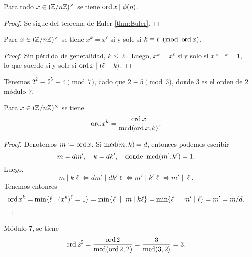 \documentclass{article}
\theoremstyle{plain}
\begin{document}
\begin{corolario}
  Para todo $x \in (\mathbb{Z}/n\mathbb{Z})^\times$ se tiene $\operatorname{ord} x \mid \phi (n)$.

  \begin{proof}
    Se sigue del teorema de Euler \ref{thm:Euler}.
  \end{proof}
\end{corolario}

\begin{corolario}
  Para $x \in (\mathbb{Z}/n\mathbb{Z})^\times$ se tiene $x^k = x^\ell$ si y solo si
  $k \equiv \ell \pmod{\operatorname{ord} x}$.

  \begin{proof}
    Sin pérdida de generalidad, $k \le \ell$. Luego, $x^k = x^\ell$ si y solo si
    $x^{\ell - k} = 1$, lo que sucede si y solo si $\operatorname{ord} x \mid (\ell - k)$.
  \end{proof}
\end{corolario}

\begin{ejemplo}
  Tenemos $2^2 \equiv 2^5 \equiv 4 \pmod{7}$, dado que $2 \equiv 5 \pmod{3}$,
  donde $3$ es el orden de $2$ módulo $7$.
\end{ejemplo}

\begin{proposicion}
  Para $x \in (\mathbb{Z}/n\mathbb{Z})^\times$ se tiene
  $$\operatorname{ord} x^k = \frac{\operatorname{ord} x}{\operatorname{mcd} (\operatorname{ord} x, k)}.$$

  \begin{proof}
    Denotemos $m \mathrel{\mathop:}= \operatorname{ord} x$. Si $\operatorname{mcd} (m, k) = d$, entonces podemos escribir
    $$m = dm', \quad k = dk', \quad \text{donde }\operatorname{mcd} (m',k') = 1.$$
    Luego,
    $$m \mid k\ell \iff dm' \mid dk'\ell \iff m' \mid k'\ell \iff m' \mid \ell.$$
    Tenemos entonces
    \[ \operatorname{ord} x^k = \min \{ \ell \mid (x^k)^\ell = 1 \}
                = \min \{ \ell ~\mid~ m \mid k\ell \}
                = \min \{ \ell ~ \mid ~ m'\mid \ell \}
                = m' = m/d. \qedhere \]
  \end{proof}
\end{proposicion}

\begin{ejemplo}
  Módulo $7$, se tiene
  \[ \operatorname{ord} 2^2 = \frac{\operatorname{ord} 2}{\operatorname{mcd} (\operatorname{ord} 2, 2)}
              = \frac{3}{\operatorname{mcd} (3, 2)} = 3. \qedhere \]
\end{ejemplo}
\end{document}
